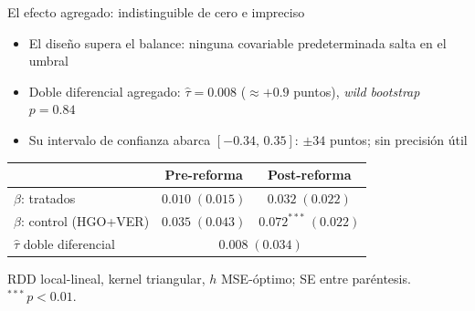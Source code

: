 \documentclass[
  aspectratio=43,        %
  t,                     %
  10pt                   %
]{beamer}
\begin{document}
\begin{frame}{El efecto agregado: indistinguible de cero e impreciso}

  \begin{itemize}
    \item El diseño \textcolor{ITAMgreen}{supera el balance}: ninguna covariable
          predeterminada salta en el umbral
    \item Doble diferencial agregado: $\hat{\tau} = 0.008$ ($\approx +0.9$
          puntos), \emph{wild bootstrap} $p = 0.84$
    \item Su intervalo de confianza abarca \textcolor{ITAMmaroon}{$[-0.34,\,
          0.35]$}: $\pm 34$ puntos; sin precisión útil
  \end{itemize}

  \vspace{0.3em}
  \begin{table}\centering\small
    \begin{tabular}{lcc}
      \toprule
       & Pre-reforma & Post-reforma \\
      \midrule
      $\beta$: tratados            & $0.010\;(0.015)$ & $0.032\;(0.022)$ \\
      $\beta$: control (HGO+VER)   & $0.035\;(0.043)$ & $0.072^{***}\;(0.022)$ \\
      \midrule
      $\hat{\tau}$ doble diferencial & \multicolumn{2}{c}{$0.008\;(0.034)$} \\
      \bottomrule
    \end{tabular}
  \end{table}

  \vspace{0.2em}
  {\footnotesize \textcolor{ITAMgray}{%
    RDD local-lineal, kernel triangular, $h$ MSE-óptimo; SE entre paréntesis.
    $^{***}\,p<0.01$.}}

\end{frame}
\end{document}

